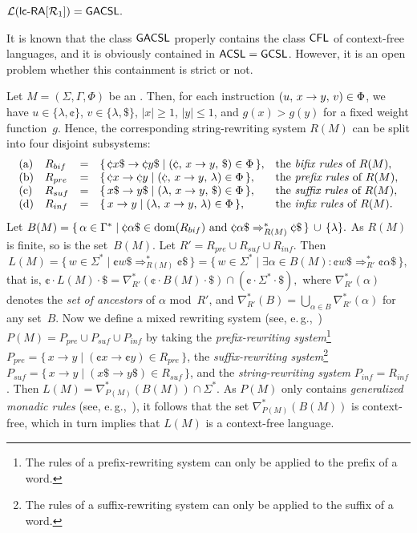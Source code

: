 \begin{theorem}\label{PropR1b}
${\mathcal L}(\lcRA[1]) = \GACSL.$
\end{theorem}

It is known that the class $\textup{\sf GACSL}$ properly contains the class $\textup{\sf CFL}$ of context-free languages, and it is obviously contained in $\textup{\sf ACSL} = \textup{\sf GCSL}$. However, it is an open problem whether this containment is strict or not.
\vspace{+0.1cm}

Let $M = (\Sigma,\Gamma,\Phi)$ be an \lcRA[2']. Then, for each instruction $(u,\,x\rightarrow y,\,v)\in \Phi$, we have $u\in\{\lambda,\cent\}$, $v\in\{\lambda,\$\}$, $|x|\ge 1$, $|y|\le 1$, and $g(x)>g(y)$ for a fixed weight function~$g$. Hence, the corresponding string-rewriting system $R(M)$ can be split into four disjoint subsystems:
$$\begin{array}{llcll}
{\rm (a)} & R_{bif} & = & \{\,\cent x\$ \to \cent y\$ \mid \rarule{\cent}{x}{y}{\$}\in \Phi\,\}, & \textup{the \emph{bifix rules} of }R(M),\\
{\rm (b)} & R_{pre}& = & \{\,\cent x \to \cent y \mid \rarule{\cent}{x}{y}{\lambda}\in \Phi\,\}, & \textup{the \emph{prefix rules} of }R(M),\\
{\rm (c)} & R_{suf}& = & \{\,x\$ \to y\$ \mid \rarule{\lambda}{x}{y}{\$}\in \Phi\,\}, & \textup{the \emph{suffix rules} of }R(M),\\
{\rm (d)} & R_{inf}& = & \{\,x \to y \mid \rarule{\lambda}{x}{y}{\lambda}\in \Phi\,\}, & \textup{the \emph{infix rules} of }R(M).\\
\end{array}$$
Let $B(M) = \{\,\alpha\in\Gamma^*\mid \cent \alpha\$\in {\rm dom}(R_{bif}) \textup{ and }
\cent \alpha\$\Rightarrow_{R(M)}^* \cent \$\,\}\,\cup\,\{\lambda\}.$ As $R(M)$ is finite, so is the set~$B(M)$. Let $R' = R_{pre}\cup R_{suf}\cup R_{inf}$. Then
$$
L(M)  =   \{\,w\in\Sigma^*\mid \cent w\$\Rightarrow_{R(M)}^*\cent\$\,\}
      =   \{\,w\in\Sigma^*\mid \exists \alpha\in B(M):\cent w\$\Rightarrow_{R'}^*\cent \alpha\$\,\},
$$
that is, $\cent\cdot L(M) \cdot \$ = \nabla_{R'}^*(\cent\cdot B(M)\cdot\$) \cap (\cent\cdot\Sigma^*\cdot\$),$ where $\nabla_{R'}^*(\alpha)$ denotes the \emph{set of ancestors} of $\alpha$ mod~$R'$, and $\nabla_{R'}^*(B) = \bigcup_{\alpha\in B}\nabla_{R'}^*(\alpha)$ for any set~$B$. Now we define a mixed rewriting system (see, e.\,g.,~\cite{Hofbauer2004301}) $P(M)=P_{pre}\cup P_{suf}\cup P_{inf}$ by taking the {\em prefix-rewriting system}\footnote{The rules of a prefix-rewriting system can only be applied to the prefix of a word.} $P_{pre}  =  \{\,x \to  y \mid (\cent x\to \cent y)\in R_{pre}\,\}$, the {\em suffix-rewriting system}\footnote{The rules of a suffix-rewriting system can only be applied to the suffix of a word.} $ P_{suf}  =  \{\,x \to  y \mid (x\$\to y\$)\in R_{suf}\,\}$, and the {\em string-rewriting system}  $P_{inf}  =  R_{inf}$. Then $L(M) = \nabla_{P(M)}^*(B(M))\cap\Sigma^*.$ As $P(M)$ only contains \emph{generalized monadic rules} (see, e.\,g.,~\cite{Leupold2011}), it follows that the set $\nabla_{P(M)}^*(B(M))$ is context-free, which in turn implies that $L(M)$ is a context-free language.


